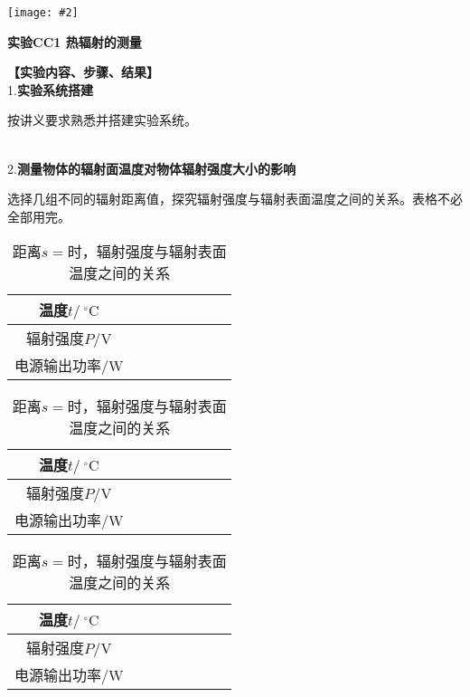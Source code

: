 \documentclass[11pt,a4paper]{ctexart}
\newcommand{\ExpeName}{实验CC1 热辐射的测量}
\newcommand{\cpic}[2]{
\begin{center}
\texttt{[image: \#2]}
\end{center}
}
\newcommand{\degreeC}{\ ^\circ \mathrm{C}}  %
\newcommand{\emptyline}{\par \ \\}
\begin{document}
\newpage%
\cpic{0.255}{e2}%
\begin{center}
\LARGE{\textbf{\ExpeName}}
\end{center}
\textbf{【实验内容、步骤、结果】}
\\
1.\textbf{实验系统搭建}\par
按讲义要求熟悉并搭建实验系统。
\emptyline
2.\textbf{测量物体的辐射面温度对物体辐射强度大小的影响}\par
选择几组不同的辐射距离值，探究辐射强度与辐射表面温度之间的关系。表格不必全部用完。
\begin{table}[H]
\centering
\caption{距离$s = $\uline{\hspace{2cm}}时，辐射强度与辐射表面温度之间的关系}
\label{t1}
\begin{tabular}{|c|p{12mm}|p{12mm}|p{12mm}|p{12mm}|p{12mm}|p{12mm}|p{12mm}|}
\hline
温度$t/\degreeC$ &  &  &  &  &  &  &  \\ \hline
辐射强度$P/\mathrm{V}$ &  &  &  &  &  &  &  \\ \hline
电源输出功率/W &  &  &  &  &  &  &  \\ \hline
\end{tabular}
\end{table}
\begin{table}[H]
\centering
\caption{距离$s = $\uline{\hspace{2cm}}时，辐射强度与辐射表面温度之间的关系}
\label{t2}
\begin{tabular}{|c|p{12mm}|p{12mm}|p{12mm}|p{12mm}|p{12mm}|p{12mm}|p{12mm}|}
\hline
温度$t/\degreeC$ &  &  &  &  &  &  &  \\ \hline
辐射强度$P/\mathrm{V}$ &  &  &  &  &  &  &  \\ \hline
电源输出功率/W &  &  &  &  &  &  &  \\ \hline
\end{tabular}
\end{table}
\begin{table}[H]
\centering
\caption{距离$s = $\uline{\hspace{2cm}}时，辐射强度与辐射表面温度之间的关系}
\label{t3}
\begin{tabular}{|c|p{12mm}|p{12mm}|p{12mm}|p{12mm}|p{12mm}|p{12mm}|p{12mm}|}
\hline
温度$t/\degreeC$ &  &  &  &  &  &  &  \\ \hline
辐射强度$P/\mathrm{V}$ &  &  &  &  &  &  &  \\ \hline
电源输出功率/W &  &  &  &  &  &  &  \\ \hline
\end{tabular}
\end{table}
\end{document}
